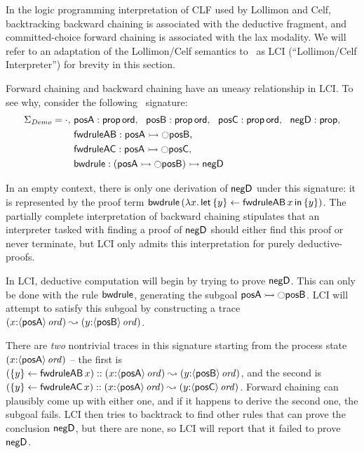 In the logic programming interpretation of CLF used by Lollimon and
Celf, backtracking backward chaining is associated with the deductive
fragment, and committed-choice forward chaining is associated with the
lax modality. We will refer to an adaptation of the Lollimon/Celf
semantics to \sls~as LCI (``Lollimon/Celf Interpreter'') for
brevity in this section.

Forward chaining and backward chaining have an uneasy relationship in
LCI. To see why, consider the following \sls~signature:
\begin{align*}
 \Sigma_{\it Demo} = \cdot, 
~&{\sf posA} : {\sf prop}\,{\sf ord}, 
~~{\sf posB} : {\sf prop}\,{\sf ord}, 
~~{\sf posC} : {\sf prop}\,{\sf ord}, 
~~{\sf negD} : {\sf prop},\\
~&{\sf fwdruleAB} : {\sf posA} \rightarrowtail {\ocircle}{\sf posB},\\
~&{\sf fwdruleAC} : {\sf posA} \rightarrowtail {\ocircle}{\sf posC},\\
~&{\sf bwdrule} : ({\sf posA} \rightarrowtail {\ocircle}{\sf posB}) \rightarrowtail {\sf negD}
\end{align*}

In an empty context, there is only one derivation of ${\sf negD}$
under this signature: it is represented by the proof term ${\sf
  bwdrule}\,(\lambda x.\,{\sf let}\,{\{{y}\} \leftarrow {{\sf
      fwdruleAB}\,x}}\,{\sf in}\,\{ {y} \})$. The partially complete interpretation of
backward chaining stipulates that an interpreter tasked with finding a
proof of ${\sf negD}$ should either find this proof or never
terminate, but LCI only admits this interpretation for purely
deductive-proofs.

In LCI, deductive computation will begin by trying to prove ${\sf
  negD}$. This can only be done with the rule ${\sf bwdrule}$,
generating the subgoal ${\sf posA} \rightarrowtail {\ocircle}{\sf posB}$.  LCI
will attempt to satisfy this subgoal by constructing a trace
$(x{:}{\langle {\sf posA} \rangle}\,{{\it ord}}) \leadsto (y{:}{\langle {\sf
    posB} \rangle}\,{{\it ord}})$.

There are {\it two} nontrivial traces in this signature starting from
the process state $(x{:}{\langle {\sf posA} \rangle}\,{{\it ord}})$ -- the first is
$(\{{y}\} \leftarrow {{\sf fwdruleAB}\,x}) :: (x{:}{\langle {\sf posA} \rangle}\,{{\it ord}})
\leadsto (y{:}{\langle {\sf posB} \rangle}\,{{\it ord}})$, and the second is
$(\{{y}\} \leftarrow {{\sf fwdruleAC}\,x})::(x{:}{\langle {\sf posA} \rangle}\,{{\it ord}})
\leadsto (y{:}{\langle {\sf posC} \rangle}\,{{\it ord}})$.  Forward chaining can
plausibly come up with either one, and if it happens to derive the
second one, the subgoal fails. LCI then tries to backtrack to find
other rules that can prove the conclusion ${\sf negD}$, but there are
none, so LCI will report that it failed to prove ${\sf negD}$.

